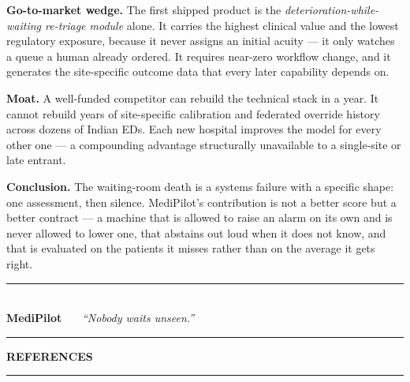 \documentclass[10pt,a4paper,twocolumn]{article}
\begin{document}
\textbf{Go-to-market wedge.} The first shipped product is the
\emph{deterioration-while-waiting re-triage module} alone. It carries the highest
clinical value and the lowest regulatory exposure, because it never assigns an initial
acuity --- it only watches a queue a human already ordered. It requires near-zero
workflow change, and it generates the site-specific outcome data that every later
capability depends on.

\textbf{Moat.} A well-funded competitor can rebuild the technical stack in a year.
It cannot rebuild years of site-specific calibration and federated override history
across dozens of Indian EDs. Each new hospital improves the model for every other one
--- a compounding advantage structurally unavailable to a single-site or late entrant.

\textbf{Conclusion.} The waiting-room death is a systems failure with a specific
shape: one assessment, then silence. MediPilot's contribution is not a better score
but a better contract --- a machine that is allowed to raise an alarm on its own and
is never allowed to lower one, that abstains out loud when it does not know, and that
is evaluated on the patients it misses rather than on the average it gets right.

\vspace{6pt}
\noindent\parbox{\linewidth}{%
  \textcolor{AccPurple}{\rule{\linewidth}{1pt}}\\[3pt]
  \centering\sffamily\footnotesize
  \textcolor{AccPurple}{\bfseries Medi}{\bfseries Pilot} \ \textbullet\ \
  \textit{``Nobody waits unseen.''}\\[3pt]
  \textcolor{Border}{\rule{\linewidth}{0.5pt}}}

\vspace{9pt}
{\sffamily\bfseries\small\color{NearBlack}REFERENCES}\par
\vspace{-1pt}\textcolor{AccPurple}{\rule{\linewidth}{1pt}}\par\vspace{2pt}
\end{document}
